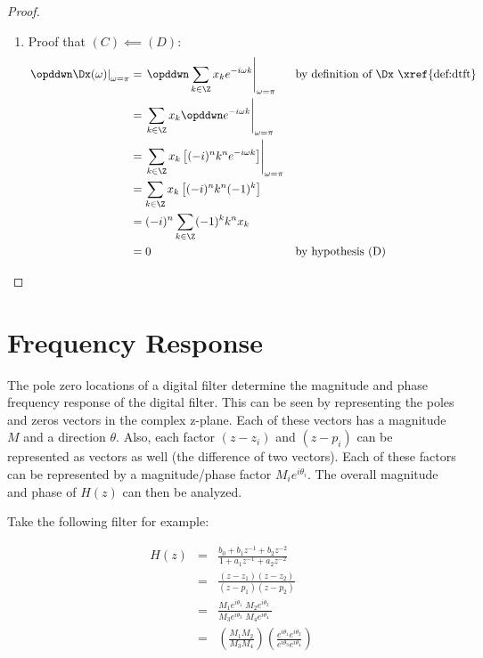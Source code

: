 \begin{proof}
\begin{enumerate}
  \item Proof that $(C)\impliedby(D)$: 
    \begin{align*}
      \left.\opddwn \Dx(\omega)\right|_{\omega=\pi}
        &= \left.\opddwn \sum_{k\in\Z} x_k e^{-i\omega k} \right|_{\omega=\pi}
        && \text{by definition of $\Dx$ \xref{def:dtft}}
      \\&= \left. \sum_{k\in\Z} x_k \opddwn e^{-i\omega k} \right|_{\omega=\pi}
      \\&= \left. \sum_{k\in\Z} x_k \left[(-i)^n k^n e^{-i\omega k}\right] \right|_{\omega=\pi}
      \\&= \sum_{k\in\Z} x_k \left[(-i)^n k^n (-1)^k\right]
      \\&= (-i)^n \sum_{k\in\Z} (-1)^k k^n x_k 
      \\&= 0
        && \text{by hypothesis (D)}
    \end{align*}
\end{enumerate}
\end{proof}





\section{Frequency Response}
The pole zero locations of a digital filter determine the magnitude and 
phase frequency response of the digital filter.
This can be seen by representing the poles and zeros vectors in the complex z-plane.
Each of these vectors has a magnitude $M$ and a direction $\theta$.
Also, each factor $(z-z_i)$ and $(z-p_i)$ can be represented as vectors as well
(the difference of two vectors).
Each of these factors can be represented by a magnitude/phase factor
$M_ie^{i\theta_i}$.  The overall magnitude and phase of $H(z)$ can then 
be analyzed.

Take the following filter for example:

\begin{eqnarray*}
   H(z) &=& \frac{b_0 + b_1z^{-1} + b_2z^{-2} }
                 {1   + a_1z^{-1} + a_2z^{-2} }
   \\   &=& \frac{(z-z_1)(z-z_2)}
                 {(z-p_1)(z-p_2)}
   \\   &=& \frac{M_1e^{i\theta_1} \; M_2e^{i\theta_2} \; }
                 {M_3e^{i\theta_3} \; M_4e^{i\theta_4} \; }
   \\   &=& \left(\frac{M_1M_2}{M_3M_4} \right)
            \left(\frac{e^{i\theta_1} e^{i\theta_2} }
                       {e^{i\theta_3} e^{i\theta_4} }\right)
\end{eqnarray*}

